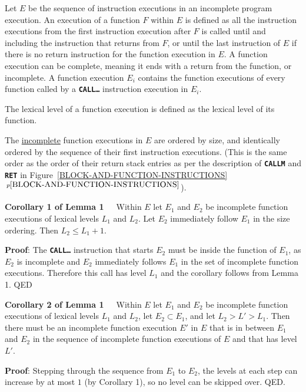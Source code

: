 \documentclass[12pt]{article}
\newcommand{\TT}[1]{{\tt \bfseries #1}}
\newcommand{\itemref}[1]{\ref{#1}$\,^{p\pageref{#1}}$}
\newenvironment{indpar}[1][0.3in]%
	{\begin{list}{}%
		     {\setlength{\itemsep}{0in}%
		      \setlength{\topsep}{0in}%
		      \setlength{\parsep}{1ex}%
		      \setlength{\labelwidth}{#1}%
		      \setlength{\leftmargin}{#1}%
		      \addtolength{\leftmargin}{\labelsep}}%
	 \item}%
	{\end{list}}
\begin{document}
Let $E$ be the sequence of instruction executions in an
incomplete program execution.
An execution of a function $F$ within $E$ is defined as all the
instruction executions from the first instruction execution
after $F$ is called until and including the instruction that returns
from $F$, or until the last instruction of $E$ if there is no return
instruction for the function execution in $E$.
A function execution can be complete, meaning
it ends with a return from the function, or incomplete.  A function execution
$E_i$ contains the function executions of every function called by
a \TT{CALL\ldots} instruction execution in $E_i$.

The lexical level of a function execution is defined as the lexical level
of its function.

The \underline{incomplete} function executions in $E$ are ordered by size, and
identically ordered by the sequence of their first instruction executions.
(This is the same order as the order of their return stack entries
as per the description of \TT{CALLM} and \TT{RET} in
Figure~\itemref{BLOCK-AND-FUNCTION-INSTRUCTIONS}).

\begin{indpar}
{\bf Corollary 1 of Lemma 1}~~~Within $E$
let $E_1$ and $E_2$ be incomplete function
executions of lexical levels
$L_1$ and $L_2$.  Let $E_2$ immediately follow $E_1$ in the size
ordering.  Then $L_2\leq L_1+1$.
\end{indpar}
\begin{indpar}
{\bf Proof}: The \TT{CALL\ldots} instruction that starts $E_2$ must be
inside the function of $E_1$, as $E_2$ is incomplete
and $E_2$ immediately follows $E_1$ in the set of incomplete
function executions.  Therefore this call has level $L_1$ and
the corollary follows from Lemma 1. QED
\end{indpar}

\begin{indpar}
{\bf Corollary 2 of Lemma 1}~~~Within $E$
let $E_1$ and $E_2$ be incomplete function
executions of lexical levels
$L_1$ and $L_2$, let $E_2\subset E_1$, and let $L_2>L'>L_1$.
Then there must be an incomplete function execution $E'$ in $E$
that is in between $E_1$ and $E_2$ in the sequence of incomplete function
executions of $E$ and that has level $L'$.
\end{indpar}
\begin{indpar}
{\bf Proof}: Stepping through the sequence from $E_1$ to $E_2$,
the levels at each step can increase by at most $1$ (by Corollary 1),
so no level can be skipped over.  QED.
\end{indpar}
\end{document}
